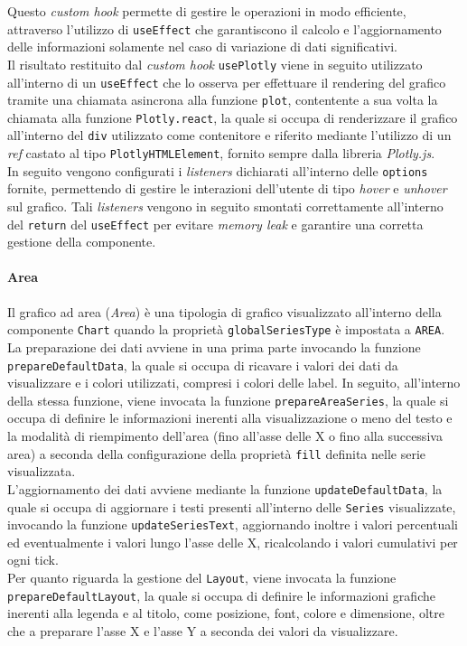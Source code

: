 Questo \textit{custom hook} permette di gestire le operazioni in modo efficiente, attraverso l'utilizzo di \texttt{useEffect} che garantiscono il calcolo e l'aggiornamento delle informazioni
solamente nel caso di variazione di dati significativi. \\
Il risultato restituito dal \textit{custom hook} \texttt{usePlotly} viene in seguito utilizzato all'interno di un \texttt{useEffect} che lo osserva per effettuare il rendering del grafico
tramite una chiamata asincrona alla funzione \texttt{plot}, contentente a sua volta la chiamata alla funzione \texttt{Plotly.react}, la quale si occupa di renderizzare il grafico all'interno del
\texttt{div} utilizzato come contenitore e riferito mediante l'utilizzo di un \textit{ref} castato al tipo \texttt{PlotlyHTMLElement}, fornito sempre dalla libreria \textit{Plotly.js}. \\
In seguito vengono configurati i \textit{listeners} dichiarati all'interno delle \texttt{options} fornite, permettendo di gestire le interazioni dell'utente di tipo \textit{hover} e \textit{unhover}
sul grafico. Tali \textit{listeners} vengono in seguito smontati correttamente all'interno del \texttt{return} del \texttt{useEffect} per evitare \textit{memory leak} e garantire una corretta gestione
della componente.

\paragraph{Area}
Il grafico ad area (\textit{Area}) è una tipologia di grafico visualizzato all'interno della componente \texttt{Chart} quando la proprietà \texttt{globalSeriesType} è impostata a \texttt{AREA}. \\
La preparazione dei dati avviene in una prima parte invocando la funzione \\
\texttt{prepareDefaultData}, la quale si occupa di ricavare i valori dei dati da visualizzare e i colori utilizzati, compresi i
colori delle label. In seguito, all'interno della stessa funzione, viene invocata la funzione \texttt{prepareAreaSeries}, la quale si occupa di definire le informazioni inerenti alla visualizzazione o meno del testo
e la modalità di riempimento dell'area (fino all'asse delle X o fino alla successiva area) a seconda della configurazione della proprietà \texttt{fill} definita nelle serie visualizzata. \\
L'aggiornamento dei dati avviene mediante la funzione \texttt{updateDefaultData}, la quale si occupa di aggiornare i testi presenti all'interno delle \texttt{Series} visualizzate, invocando la funzione
\texttt{updateSeriesText}, aggiornando inoltre i valori percentuali ed eventualmente i valori lungo l'asse delle X, ricalcolando i valori cumulativi per ogni tick. \\
Per quanto riguarda la gestione del \texttt{Layout}, viene invocata la funzione \\
\texttt{prepareDefaultLayout}, la quale si occupa di definire le informazioni grafiche inerenti alla legenda e al titolo, come posizione,
font, colore e dimensione, oltre che a preparare l'asse X e l'asse Y a seconda dei valori da visualizzare.


